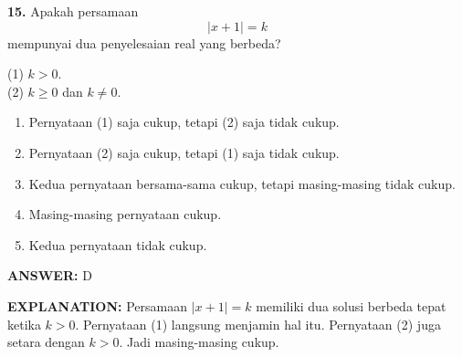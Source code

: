 \documentclass[11pt,a4paper]{article}
\newcommand{\answer}[1]{\par\medskip\textbf{\color{jawab}ANSWER:} #1\par}
\newcommand{\explanation}[1]{\textbf{\color{jelas}EXPLANATION:} #1\par\medskip}
\newcommand{\question}[1]{\Needspace{8\baselineskip}\par\medskip\textbf{#1}\quad}
\newenvironment{choices}{\begin{enumerate}[label=\Alph*.,leftmargin=1.8em]}{\end{enumerate}}
\begin{document}
\question{15.} Apakah persamaan
\[
|x+1|=k
\]
mempunyai dua penyelesaian real yang berbeda?

(1) $k>0$.\\
(2) $k\ge0$ dan $k\ne0$.
\begin{choices}
\item Pernyataan (1) saja cukup, tetapi (2) saja tidak cukup.
\item Pernyataan (2) saja cukup, tetapi (1) saja tidak cukup.
\item Kedua pernyataan bersama-sama cukup, tetapi masing-masing tidak cukup.
\item Masing-masing pernyataan cukup.
\item Kedua pernyataan tidak cukup.
\end{choices}
\answer{D}
\explanation{Persamaan $|x+1|=k$ memiliki dua solusi berbeda tepat ketika $k>0$. Pernyataan (1) langsung menjamin hal itu. Pernyataan (2) juga setara dengan $k>0$. Jadi masing-masing cukup.}
\end{document}

